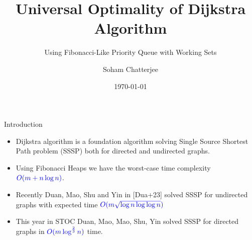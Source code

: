 \documentclass[10pt]{beamer}
\title{Universal Optimality of Dijkstra Algorithm}
\subtitle{Using Fibonacci-Like Priority Queue with Working Sets}
\date{\today}
\author{Soham Chatterjee}
\institute{Oral Qualifier, STCS}
\begin{document}
\maketitle


\begin{frame}{Introduction}
	\begin{itemize}
		\item Dijkstra algorithm is a foundation algorithm solving Single Source Shortest Path problem (SSSP) both for directed and undirected graphs.\vfill
		\item Using Fibonacci Heaps we have the worst-case time complexity $\mathcolor{blue}{O(m+n\log n)}$. \vfill \pause
		\item Recently Duan, Mao, Shu and Yin in [Dua+23] solved SSSP for undirected graphs with expected time $\mathcolor{blue}{O(m\sqrt{\log n\log\log n})}$\vfill\pause
		\item This year in STOC Duan, Mao, Mao, Shu, Yin solved SSSP for directed graphs in $\mathcolor{blue}{O(m\log^{\frac23}n)}$ time.
	\end{itemize}
\end{frame}
\end{document}
